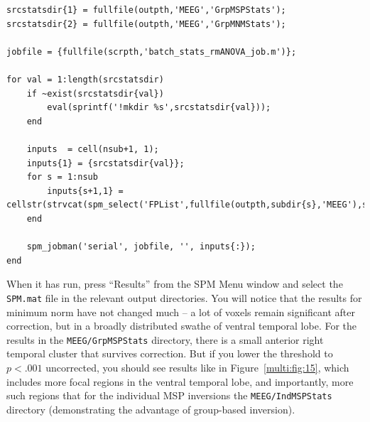 \begin{lstlisting}[style=Matlab-editor,basicstyle=\mlttfamily\footnotesize]
srcstatsdir{1} = fullfile(outpth,'MEEG','GrpMSPStats');
srcstatsdir{2} = fullfile(outpth,'MEEG','GrpMNMStats');

jobfile = {fullfile(scrpth,'batch_stats_rmANOVA_job.m')};

for val = 1:length(srcstatsdir)
    if ~exist(srcstatsdir{val})
        eval(sprintf('!mkdir %s',srcstatsdir{val}));
    end
    
    inputs  = cell(nsub+1, 1);    
    inputs{1} = {srcstatsdir{val}};    
    for s = 1:nsub
        inputs{s+1,1} = cellstr(strvcat(spm_select('FPList',fullfile(outpth,subdir{s},'MEEG'),sprintf('^apMcbdspmeeg_run_01_sss_%d.*\.gii',val))));   
    end
    
    spm_jobman('serial', jobfile, '', inputs{:});
end
\end{lstlisting}

When it has run, press ``Results'' from the SPM Menu window and select the \texttt{SPM.mat} file in the relevant output directories. You will notice that the results for minimum norm have not changed much -- a lot of voxels remain significant after correction, but in a broadly distributed swathe of ventral temporal lobe. For the results in the \texttt{MEEG/GrpMSPStats} directory, there is a small anterior right temporal cluster that survives correction. But if you lower the threshold to \(p<.001\) uncorrected, you should see results like in Figure~\ref{multi:fig:15}, which includes more focal regions in the ventral temporal lobe, and importantly, more such regions that for the individual MSP inversions the \texttt{MEEG/IndMSPStats} directory (demonstrating the advantage of group-based inversion).

